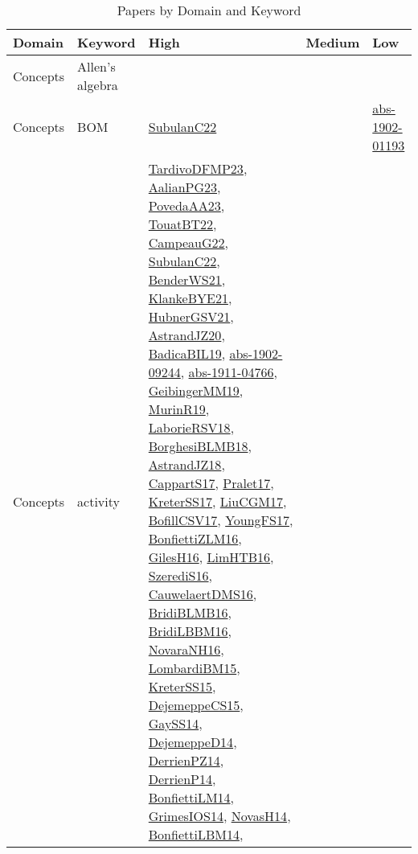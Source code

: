 {\scriptsize
\begin{longtable}{lp{3cm}>{\raggedright}p{6cm}>{\raggedright}p{6cm}p{8cm}}
\caption{Papers by Domain and Keyword}\\ \toprule
Domain & Keyword & High & Medium & Low\\ \midrule\endhead
\bottomrule
\endfoot
Concepts & Allen's algebra &  &  & \\
Concepts & BOM & \href{articles/SubulanC22.pdf}{SubulanC22}\cite{SubulanC22} &  & \href{articles/abs-1902-01193.pdf}{abs-1902-01193}\cite{abs-1902-01193}\\
Concepts & activity & \href{papers/TardivoDFMP23.pdf}{TardivoDFMP23}\cite{TardivoDFMP23}, \href{papers/AalianPG23.pdf}{AalianPG23}\cite{AalianPG23}, \href{papers/PovedaAA23.pdf}{PovedaAA23}\cite{PovedaAA23}, \href{papers/TouatBT22.pdf}{TouatBT22}\cite{TouatBT22}, \href{articles/CampeauG22.pdf}{CampeauG22}\cite{CampeauG22}, \href{articles/SubulanC22.pdf}{SubulanC22}\cite{SubulanC22}, \href{papers/BenderWS21.pdf}{BenderWS21}\cite{BenderWS21}, \href{papers/KlankeBYE21.pdf}{KlankeBYE21}\cite{KlankeBYE21}, \href{articles/HubnerGSV21.pdf}{HubnerGSV21}\cite{HubnerGSV21}, \href{articles/AstrandJZ20.pdf}{AstrandJZ20}\cite{AstrandJZ20}, \href{papers/BadicaBIL19.pdf}{BadicaBIL19}\cite{BadicaBIL19}, \href{articles/abs-1902-09244.pdf}{abs-1902-09244}\cite{abs-1902-09244}, \href{articles/abs-1911-04766.pdf}{abs-1911-04766}\cite{abs-1911-04766}, \href{papers/GeibingerMM19.pdf}{GeibingerMM19}\cite{GeibingerMM19}, \href{papers/MurinR19.pdf}{MurinR19}\cite{MurinR19}, \href{articles/LaborieRSV18.pdf}{LaborieRSV18}\cite{LaborieRSV18}, \href{articles/BorghesiBLMB18.pdf}{BorghesiBLMB18}\cite{BorghesiBLMB18}, \href{papers/AstrandJZ18.pdf}{AstrandJZ18}\cite{AstrandJZ18}, \href{papers/CappartS17.pdf}{CappartS17}\cite{CappartS17}, \href{papers/Pralet17.pdf}{Pralet17}\cite{Pralet17}, \href{articles/KreterSS17.pdf}{KreterSS17}\cite{KreterSS17}, \href{papers/LiuCGM17.pdf}{LiuCGM17}\cite{LiuCGM17}, \href{papers/BofillCSV17.pdf}{BofillCSV17}\cite{BofillCSV17}, \href{papers/YoungFS17.pdf}{YoungFS17}\cite{YoungFS17}, \href{papers/BonfiettiZLM16.pdf}{BonfiettiZLM16}\cite{BonfiettiZLM16}, \href{papers/GilesH16.pdf}{GilesH16}\cite{GilesH16}, \href{papers/LimHTB16.pdf}{LimHTB16}\cite{LimHTB16}, \href{papers/SzerediS16.pdf}{SzerediS16}\cite{SzerediS16}, \href{papers/CauwelaertDMS16.pdf}{CauwelaertDMS16}\cite{CauwelaertDMS16}, \href{articles/BridiBLMB16.pdf}{BridiBLMB16}\cite{BridiBLMB16}, \href{papers/BridiLBBM16.pdf}{BridiLBBM16}\cite{BridiLBBM16}, \href{articles/NovaraNH16.pdf}{NovaraNH16}\cite{NovaraNH16}, \href{papers/LombardiBM15.pdf}{LombardiBM15}\cite{LombardiBM15}, \href{papers/KreterSS15.pdf}{KreterSS15}\cite{KreterSS15}, \href{papers/DejemeppeCS15.pdf}{DejemeppeCS15}\cite{DejemeppeCS15}, \href{papers/GaySS14.pdf}{GaySS14}\cite{GaySS14}, \href{papers/DejemeppeD14.pdf}{DejemeppeD14}\cite{DejemeppeD14}, \href{papers/DerrienPZ14.pdf}{DerrienPZ14}\cite{DerrienPZ14}, \href{papers/DerrienP14.pdf}{DerrienP14}\cite{DerrienP14}, \href{papers/BonfiettiLM14.pdf}{BonfiettiLM14}\cite{BonfiettiLM14}, \href{articles/GrimesIOS14.pdf}{GrimesIOS14}\cite{GrimesIOS14}, \href{articles/NovasH14.pdf}{NovasH14}\cite{NovasH14}, \href{articles/BonfiettiLBM14.pdf}{BonfiettiLBM14}\cite{BonfiettiLBM14}, 
\end{longtable}}
